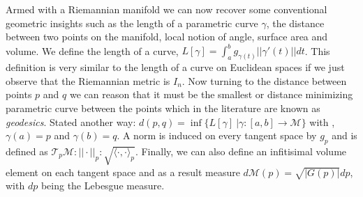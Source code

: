 Armed with a Riemannian manifold we can now recover some conventional geometric insights such as the length of a parametric curve $\gamma$, the distance between two points on the manifold, local notion of angle, surface area and volume. We define the length of a curve, $L[\gamma] = \int_a^b g_{\gamma (t)} || \gamma '(t)|| dt$. This definition is very similar to the length of a curve on Euclidean spaces if we just observe that the Riemannian metric is $I_n$. Now turning to the distance between points $p$ and $q$ we can reason that it must be the smallest or distance minimizing parametric curve between the points which in the literature are known as \textit{geodesics}. Stated another way: $d(p,q) = \inf \big\{ L[\gamma] \ | \gamma:[a,b] \to \mathcal{M}\big\}$ with ,  $\gamma(a)=p$ and $\gamma(b)=q$. A norm is induced on every tangent space by $g_p$ and is defined as $\mathcal{T}_p\mathcal{M}: || \cdot ||_p :\sqrt{\langle \cdot, \cdot \rangle_p}$. Finally, we can also define an infitisimal volume element on each tangent space and as a result measure $d\mathcal{M}(p) = \sqrt{|G(p)|} dp$, with $dp$ being the Lebesgue measure. 

